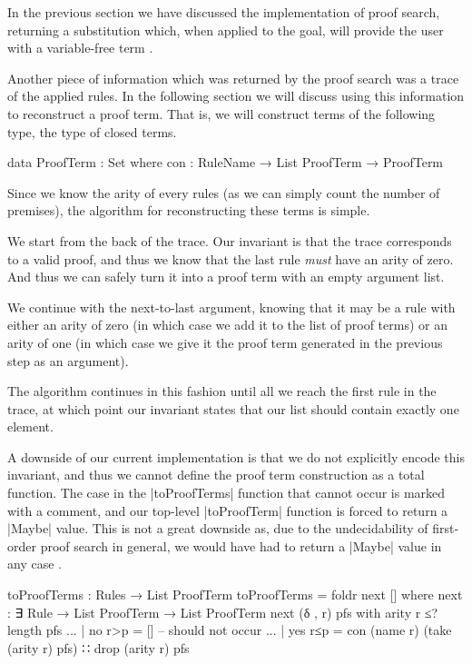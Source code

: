 \documentclass[preprint]{sigplanconf}
\begin{document}
In the previous section we have discussed the implementation of proof
search, returning a substitution which, when applied to the goal, will
provide the user with a variable-free term .

Another piece of information which was returned by the proof search
was a trace of the applied rules. In the following section we will
discuss using this information to reconstruct a proof term. That
is, we will construct terms of the following type, the type of closed
terms.
\begin{code}
data ProofTerm : Set where
  con : RuleName → List ProofTerm → ProofTerm
\end{code}
Since we know the arity of every rules (as we can simply count the
number of premises), the algorithm for reconstructing these terms is
simple.

We start from the back of the trace. Our invariant is that the trace
corresponds to a valid proof, and thus we know that the last rule
\emph{must} have an arity of zero. And thus we can safely turn it into
a proof term with an empty argument list.

We continue with the next-to-last argument, knowing that it may be a
rule with either an arity of zero (in which case we add it to the list
of proof terms) or an arity of one (in which case we give it the
proof term generated in the previous step as an argument).

The algorithm continues in this fashion until all we reach the first
rule in the trace, at which point our invariant states that our list
should contain exactly one element.

A downside of our current implementation is that we do not explicitly
encode this invariant, and thus we cannot define the proof term
construction as a total function. The case in the |toProofTerms|
function that cannot occur is marked with a comment, and our top-level
|toProofTerm| function is forced to return a |Maybe| value. This is
not a great downside as, due to the undecidability of first-order
proof search in general, we would have had to return a |Maybe| value
in any case .

\begin{code}
toProofTerms : Rules → List ProofTerm
toProofTerms = foldr next []
  where
    next : ∃ Rule → List ProofTerm → List ProofTerm
    next (δ , r) pfs with arity r ≤? length pfs
    ... | no   r>p = [] -- should not occur
    ... | yes  r≤p =
      con (name r) (take (arity r) pfs) ∷ drop (arity r) pfs
\end{code}
\end{document}
